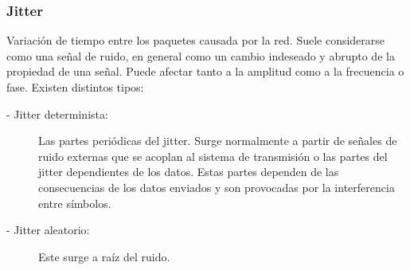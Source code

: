 \documentclass[a4paper, 11pt]{article} %
\begin{document}
		\subsubsection{Jitter} \label{jitter}
			Variación de tiempo entre los paquetes causada por la red. Suele considerarse como una señal de ruido, en general como un cambio indeseado y abrupto de la propiedad de una señal. Puede afectar tanto a la amplitud como a la frecuencia o fase.
			Existen distintos tipos:
			\begin{description}
				\item[- Jitter determinista:] Las partes periódicas del jitter. Surge normalmente a partir de señales de ruido externas que se acoplan al sistema de transmisión o las partes del jitter dependientes de los datos. Estas partes dependen de las consecuencias de los datos enviados y son provocadas por la interferencia entre símbolos.
				\item[- Jitter aleatorio:] Este surge a raíz del ruido.
			\end{description}
\end{document}
